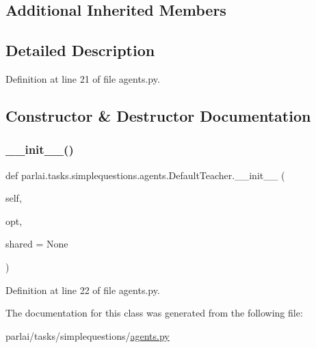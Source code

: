 \subsection*{Additional Inherited Members}


\subsection{Detailed Description}


Definition at line 21 of file agents.\+py.



\subsection{Constructor \& Destructor Documentation}
\mbox{\label{classparlai_1_1tasks_1_1simplequestions_1_1agents_1_1DefaultTeacher_a94f826fb0eec41783ccfdab6ba77c0d1}} 
\subsubsection{\texorpdfstring{\+\_\+\+\_\+init\+\_\+\+\_\+()}{\_\_init\_\_()}}
{\footnotesize\ttfamily def parlai.\+tasks.\+simplequestions.\+agents.\+Default\+Teacher.\+\_\+\+\_\+init\+\_\+\+\_\+ (\begin{DoxyParamCaption}\item[{}]{self,  }\item[{}]{opt,  }\item[{}]{shared = {\ttfamily None} }\end{DoxyParamCaption})}



Definition at line 22 of file agents.\+py.



The documentation for this class was generated from the following file\+:\begin{DoxyCompactItemize}
\item 
parlai/tasks/simplequestions/\hyperlink{parlai_2tasks_2simplequestions_2agents_8py}{agents.\+py}\end{DoxyCompactItemize}
